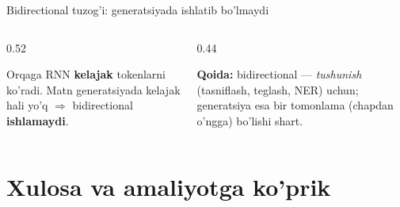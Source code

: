 \documentclass[aspectratio=169,11pt]{beamer}
\begin{document}
\begin{frame}{Bidirectional tuzog'i: generatsiyada ishlatib bo'lmaydi}
  \begin{columns}[T]
    \begin{column}{0.52\textwidth}
      \begin{tcolorbox}[warnbox,title=Sababiyat (causality) buziladi]
        \small
        Orqaga RNN \textbf{kelajak} tokenlarni ko'radi. Matn generatsiyada kelajak
        hali yo'q $\Rightarrow$ bidirectional \textbf{ishlamaydi}.
      \end{tcolorbox}
    \end{column}
    \begin{column}{0.44\textwidth}
      \begin{tcolorbox}[okbox,top=2pt,bottom=2pt]
        \footnotesize
        \textbf{Qoida:} bidirectional --- \emph{tushunish} (tasniflash, teglash, NER)
        uchun; generatsiya esa bir tomonlama (chapdan o'ngga) bo'lishi shart.
      \end{tcolorbox}
    \end{column}
  \end{columns}
\end{frame}

\section[Xulosa]{Xulosa va amaliyotga ko'prik}
\end{document}
